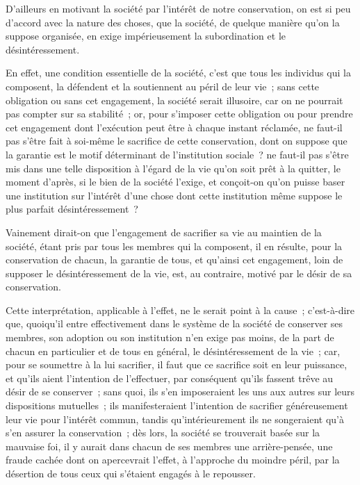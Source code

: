 \documentclass[french,twoside]{book} %
\begin{document}
D’ailleurs en motivant la société par l’intérêt de notre conservation, on est si peu d’accord avec la nature des choses, que la société, de quelque manière qu’on la suppose organisée, en exige impérieusement la subordination et le désintéressement.\par
En effet, une condition essentielle de la société, c’est que tous les individus qui la composent, la défendent et la soutiennent au péril de leur vie ; sans cette obligation ou sans cet engagement, la société serait illusoire, car on ne pourrait pas compter sur sa stabilité ; or, pour s’imposer cette obligation ou pour prendre cet engagement dont l’exécution peut être à chaque instant réclamée, ne faut-il pas s’être fait à soi-même le sacrifice de cette conservation, dont on suppose que la garantie est le motif déterminant de l’institution sociale ? ne faut-il pas s’être mis dans une telle disposition à l’égard de la vie qu’on soit prêt à la quitter, le moment d’après, si le bien de la société l’exige, et conçoit-on qu’on puisse baser une institution sur l’intérêt d’une chose dont cette institution même suppose le plus parfait désintéressement ?\par
Vainement dirait-on que l’engagement de sacrifier sa vie au maintien de la société, étant pris par tous les membres qui la composent, il en résulte, pour la conservation de chacun, la garantie de tous, et qu’ainsi cet engagement, loin de supposer le désintéressement de la vie, est, au contraire, motivé par le désir de sa conservation.\par
Cette interprétation, applicable à l’effet, ne le serait point à la cause ; c’est-à-dire que, quoiqu’il entre effectivement dans le système de la société de conserver ses membres, son adoption ou son institution n’en exige pas moins, de la part de chacun en particulier et de tous en général, le désintéressement de la vie ; car, pour se soumettre à la lui sacrifier, il faut que ce sacrifice soit en leur puissance, et qu’ils aient l’intention de l’effectuer, par conséquent qu’ils fassent trêve au désir de se conserver ; sans quoi, ils s’en imposeraient les uns aux autres sur leurs dispositions mutuelles ; ils manifesteraient l’intention de sacrifier généreusement leur vie pour l’intérêt commun, tandis qu’intérieurement ils ne songeraient qu’à s’en assurer la conservation ; dès lors, la société se trouverait basée sur la mauvaise foi, il y aurait dans chacun de ses membres une arrière-pensée, une fraude cachée dont on apercevrait l’effet, à l’approche du moindre péril, par la désertion de tous ceux qui s’étaient engagés à le repousser.\par
\end{document}

